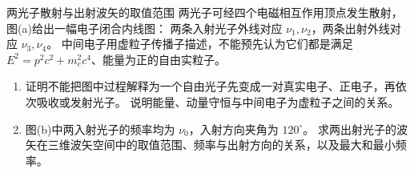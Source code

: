 \begin{advexamplebox}{两光子散射与出射波矢的取值范围}\label{advA6:ex:photon-scattering}
两光子可经四个电磁相互作用顶点发生散射，图(a)给出一幅电子闭合内线图：
两条入射光子外线对应 $\nu_1,\nu_2$，两条出射外线对应 $\nu_3,\nu_4$。
中间电子用虚粒子传播子描述，不能预先认为它们都是满足
$E^2=p^2c^2+m_e^2c^4$、能量为正的自由实粒子。
\begin{enumerate}
\item 证明不能把图中过程解释为一个自由光子先变成一对真实电子、正电子，再依次吸收或发射光子。
说明能量、动量守恒与中间电子为虚粒子之间的关系。
\item 图(b)中两入射光子的频率均为 $\nu_0$，入射方向夹角为 $120^\circ$。
求两出射光子的波矢在三维波矢空间中的取值范围、频率与出射方向的关系，以及最大和最小频率。
\end{enumerate}
\begin{center}

\label{advA6:quality:A6-source-exercises:q3}

\end{center}
\end{advexamplebox}
